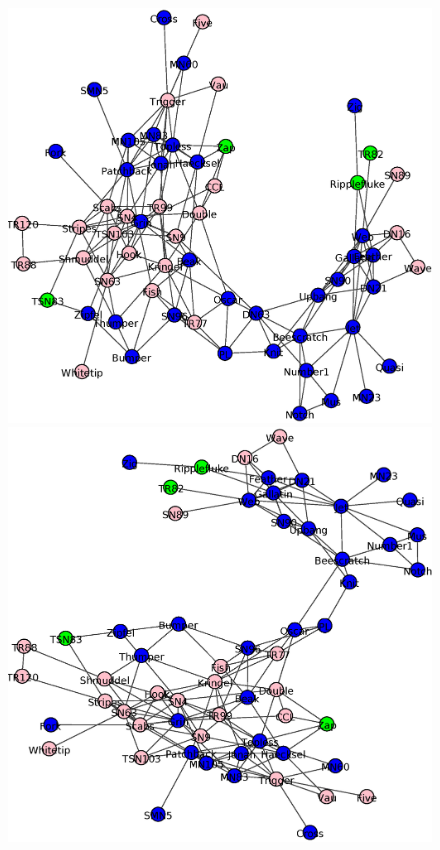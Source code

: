 \begin{figure}
\centering
\includegraphics[scale = 0.28]{figuras/Parte_c0} 
\includegraphics[scale = 0.28]{figuras/Parte_c1} \\

\end{figure}
